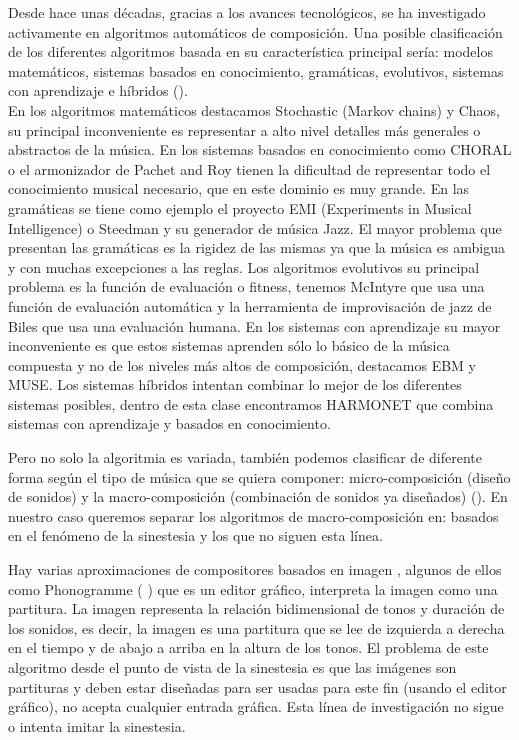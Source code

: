 Desde hace unas décadas, gracias a los avances tecnológicos, se ha investigado activamente en algoritmos automáticos de composición. Una posible clasificación de los diferentes algoritmos basada en su característica principal sería: modelos matemáticos, sistemas basados en conocimiento, gramáticas, evolutivos, sistemas con aprendizaje e híbridos (\cite{AIMethodsForComposition}). \\
\color{blue} En los algoritmos matemáticos destacamos Stochastic (Markov chains) y Chaos, su principal inconveniente es representar a alto nivel detalles más generales o abstractos de la música. En los sistemas basados en conocimiento como CHORAL o el armonizador de Pachet and Roy tienen la dificultad de representar todo el conocimiento musical necesario, que en este dominio es muy grande. En las gramáticas se tiene como ejemplo el proyecto EMI (Experiments in Musical Intelligence) o Steedman y su generador de música Jazz. El mayor problema que presentan las gramáticas es la rigidez de las mismas ya que la música es ambigua y con muchas excepciones a las reglas. Los algoritmos evolutivos su principal problema es la función de evaluación o fitness, tenemos McIntyre que usa una función de evaluación automática y la herramienta de improvisación de jazz de Biles que usa una evaluación humana. En los sistemas con aprendizaje su mayor inconveniente es que estos sistemas aprenden sólo lo básico de la música compuesta y no de los niveles más altos de composición, destacamos EBM y MUSE. Los sistemas híbridos intentan combinar lo mejor de los diferentes sistemas posibles, dentro de esta clase encontramos HARMONET que combina sistemas con aprendizaje y basados en conocimiento.
\color{black}

Pero no solo la algoritmia es variada, también podemos clasificar de diferente forma según el tipo de música que se quiera componer: micro-composición (diseño de sonidos) y la macro-composición (combinación de sonidos ya diseñados) (\cite{AudioVisualSurvey}). \color{blue} En nuestro caso queremos separar los algoritmos de macro-composición en: basados en el fenómeno de la sinestesia y los que no siguen esta línea.\\ \color{black}

Hay varias aproximaciones de compositores basados en imagen , algunos de ellos como Phonogramme (\cite{ImageBaseComposition} \cite{Phonogramme}) que es un editor gráfico, interpreta la imagen como una partitura. \color{blue} La imagen representa la relación bidimensional de tonos y duración de los sonidos, es decir, la imagen es una partitura que se lee de izquierda a derecha en el tiempo y de abajo a arriba en la altura de los tonos. El problema de este algoritmo desde el punto de vista de la sinestesia es que las imágenes son partituras y deben estar diseñadas para ser usadas para este fin (usando el editor gráfico), no acepta cualquier entrada gráfica. Esta línea de investigación no sigue o intenta imitar la sinestesia.\\ \color{black}

